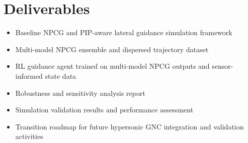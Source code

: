 \section{Deliverables}

\begin{itemize}
  \item Baseline NPCG and PIP-aware lateral guidance simulation framework
  \item Multi-model NPCG ensemble and dispersed trajectory dataset
  \item RL guidance agent trained on multi-model NPCG outputs and sensor-informed state data
  \item Robustness and sensitivity analysis report
  \item Simulation validation results and performance assessment
  \item Transition roadmap for future hypersonic GNC integration and validation activities
\end{itemize}
